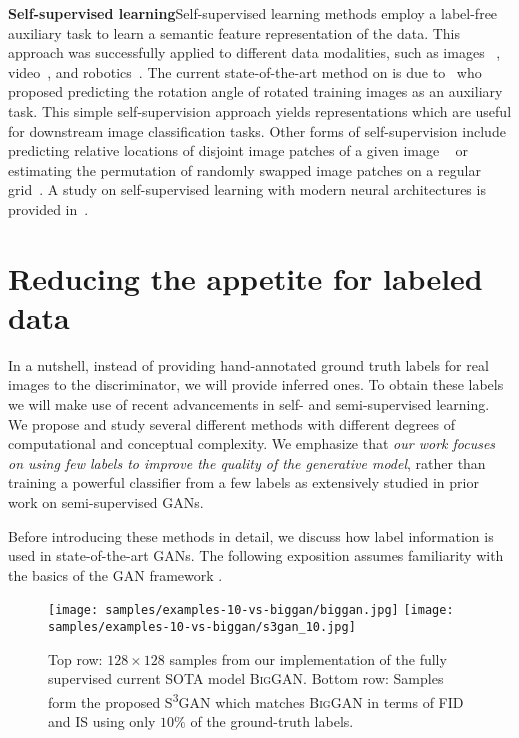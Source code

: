 \documentclass{article}
\newcommand{\tranSSS}{\textsc{S\textsuperscript{3}GAN}}
\newcommand{\biggan}{\textsc{BigGAN}}
\begin{document}
\textbf{Self-supervised learning}\quad Self-supervised learning methods employ a label-free auxiliary task to learn a semantic feature representation of the data. This approach was successfully applied to different data modalities, such as images ~\citep{doersch2015unsupervised, caron2018deep}, video~\citep{agrawal2015learning,lee2017unsupervised}, and robotics~\citep{jang2018grasp2vec,pinto2016supersizing}. The current state-of-the-art method on \imagenet{} is due to~\citet{gidaris2018unsupervised} who proposed predicting the rotation angle of rotated training images as an auxiliary task. This simple self-supervision approach yields representations which are useful for downstream image classification tasks. Other forms of self-supervision include predicting relative locations of disjoint image patches of a given image ~\citep{doersch2015unsupervised, mundhenk2018improvements} or estimating the permutation of randomly swapped image patches on a regular grid~\citep{noroozi2016unsupervised}. A study on self-supervised learning with modern neural architectures is provided in~\citet{kolesnikov2019revisiting}.


\section{Reducing the appetite for labeled data}
In a nutshell, instead of providing hand-annotated ground truth labels for real images to the discriminator, we will provide inferred ones. To obtain these labels we will make use of recent advancements in self- and semi-supervised learning. We propose and study several different methods with different degrees of computational and conceptual complexity. We emphasize that \emph{our work focuses on using few labels to improve the quality of the generative model}, rather than training a powerful classifier from a few labels as extensively studied in prior work on semi-supervised GANs. 

Before introducing these methods in detail, we discuss how label information is used in state-of-the-art GANs. The following exposition assumes familiarity with the basics of the GAN framework \cite{goodfellow2014generative}. 

\begin{figure}[t]
\centering
\texttt{[image: samples/examples-10-vs-biggan/biggan.jpg]}
\texttt{[image: samples/examples-10-vs-biggan/s3gan\_10.jpg]}
\caption{Top row: $128 \times 128$ samples from our implementation of the fully supervised current SOTA model \biggan{}. Bottom row: Samples form the proposed \tranSSS{} which matches \biggan{} in terms of FID and IS using only $10\%$ of the ground-truth labels.} 
\end{figure}
\end{document}
